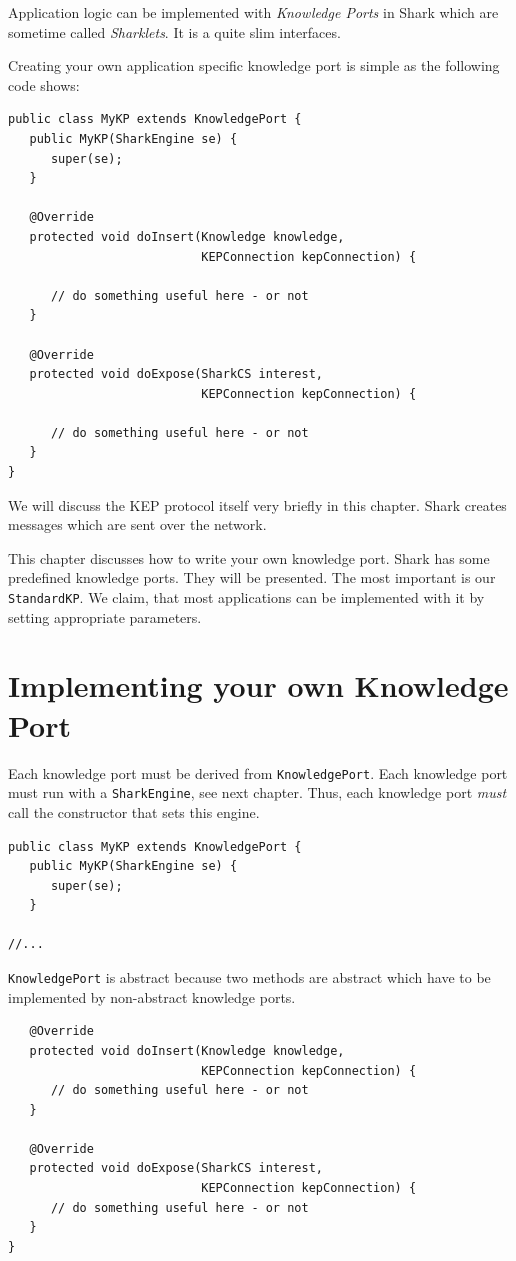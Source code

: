 Application logic can be implemented with {\it Knowledge Ports} in Shark which are sometime called {\it Sharklets}. It is a quite slim interfaces. 

Creating your own application specific knowledge port is simple as the following code shows:

\begin{verbatim}
public class MyKP extends KnowledgePort {
   public MyKP(SharkEngine se) {
      super(se);
   }

   @Override
   protected void doInsert(Knowledge knowledge, 
                           KEPConnection kepConnection) {

      // do something useful here - or not
   }

   @Override
   protected void doExpose(SharkCS interest, 
                           KEPConnection kepConnection) {

      // do something useful here - or not
   }
}
\end{verbatim}

We will discuss the KEP protocol itself very briefly in this chapter. Shark creates messages which are sent over the network.

This chapter discusses how to write your own knowledge port. Shark has some predefined knowledge ports. They will be presented. The most important is our {\tt StandardKP}. We claim, that most applications can be implemented with it by setting appropriate parameters. 

\section{Implementing your own Knowledge Port}
Each knowledge port must be derived from {\tt KnowledgePort}. Each knowledge port must run with a {\tt SharkEngine}, see next chapter. Thus, each knowledge port {\it must} call the constructor that sets this engine.

\begin{verbatim}
public class MyKP extends KnowledgePort {
   public MyKP(SharkEngine se) {
      super(se);
   }

//...
\end{verbatim}

{\tt KnowledgePort} is abstract because two methods are abstract which have to be implemented by non-abstract knowledge ports.


\begin{verbatim}
   @Override
   protected void doInsert(Knowledge knowledge, 
                           KEPConnection kepConnection) {
      // do something useful here - or not
   }

   @Override
   protected void doExpose(SharkCS interest, 
                           KEPConnection kepConnection) {
      // do something useful here - or not
   }
}
\end{verbatim}

